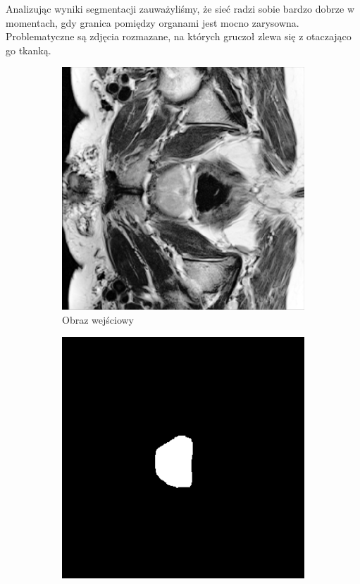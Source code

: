 \documentclass[a4paper,11pt,twoside]{report}
\theoremstyle{definition}
\begin{document}
Analizując wyniki segmentacji zauważyliśmy, że sieć radzi sobie bardzo dobrze w momentach, gdy granica pomiędzy organami jest mocno zarysowna. Problematyczne są zdjęcia rozmazane, na których gruczoł zlewa się z otaczająco go tkanką.

\begin{figure}[htb]
	\centering %
	\begin{subfigure}{0.25\textwidth}
		\includegraphics[width=\linewidth]{segmentation/segmentation_train_1.png}
		\caption{Obraz wejściowy}
		\label{fig:1}
	\end{subfigure}\hfil %
	\begin{subfigure}{0.25\textwidth}
		\includegraphics[width=\linewidth]{segmentation/segmentaion_mask_1.png}

\end{subfigure}
\end{figure}
\end{document}
